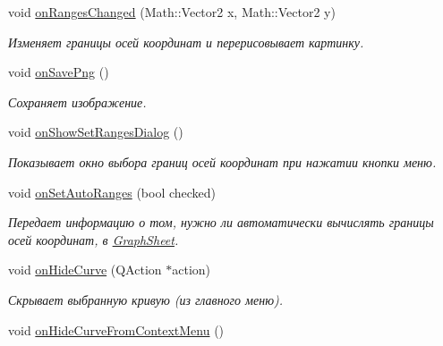 \begin{DoxyCompactItemize}
void \hyperlink{class_graph_window_a76559e3f41e482a43f715f519df4487c}{on\+Ranges\+Changed} (Math\+::\+Vector2 x, Math\+::\+Vector2 y)
\begin{DoxyCompactList}\small\item\em Изменяет границы осей координат и перерисовывает картинку. \end{DoxyCompactList}\item 
void \hyperlink{class_graph_window_a51f89adcbef5b90b9fdbb24bf7536fe5}{on\+Save\+Png} ()
\begin{DoxyCompactList}\small\item\em Сохраняет изображение. \end{DoxyCompactList}\item 
\hypertarget{class_graph_window_aca7c92575aaed2db319bb86a1e1e36e9}{}\label{class_graph_window_aca7c92575aaed2db319bb86a1e1e36e9} 
void \hyperlink{class_graph_window_aca7c92575aaed2db319bb86a1e1e36e9}{on\+Show\+Set\+Ranges\+Dialog} ()
\begin{DoxyCompactList}\small\item\em Показывает окно выбора границ осей координат при нажатии кнопки меню. \end{DoxyCompactList}\item 
\hypertarget{class_graph_window_ac6e6c5f747d9fc8d4f1988262cf12303}{}\label{class_graph_window_ac6e6c5f747d9fc8d4f1988262cf12303} 
void \hyperlink{class_graph_window_ac6e6c5f747d9fc8d4f1988262cf12303}{on\+Set\+Auto\+Ranges} (bool checked)
\begin{DoxyCompactList}\small\item\em Передает информацию о том, нужно ли автоматически вычислять границы осей координат, в \hyperlink{class_graph_sheet}{Graph\+Sheet}. \end{DoxyCompactList}\item 
\hypertarget{class_graph_window_aa5e82d18c3767b11b36b1b76cf989054}{}\label{class_graph_window_aa5e82d18c3767b11b36b1b76cf989054} 
void \hyperlink{class_graph_window_aa5e82d18c3767b11b36b1b76cf989054}{on\+Hide\+Curve} (Q\+Action $\ast$action)
\begin{DoxyCompactList}\small\item\em Скрывает выбранную кривую (из главного меню). \end{DoxyCompactList}\item 
\hypertarget{class_graph_window_a81681956de7261ef2fa6b6ed28e2e903}{}\label{class_graph_window_a81681956de7261ef2fa6b6ed28e2e903} 
void \hyperlink{class_graph_window_a81681956de7261ef2fa6b6ed28e2e903}{on\+Hide\+Curve\+From\+Context\+Menu} ()

\end{DoxyCompactItemize}
